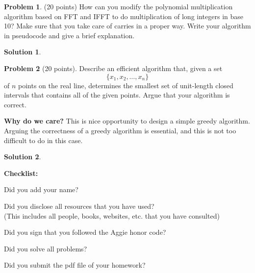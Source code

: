 \documentclass{article}
\theoremstyle{definition}
\newtheorem{problem}{Problem}
\newtheorem*{solution}{Solution}
\newcommand{\checklist}{\noindent\textbf{Checklist:}
\begin{compactitem}[$\Box$] 
\item Did you add your name? 
\item Did you disclose all resources that you have used? \\
(This includes all people, books, websites, etc. that you have consulted)
\item Did you sign that you followed the Aggie honor code? 
\item Did you solve all problems? 
\item Did you submit the pdf file of your homework?
\end{compactitem}
}
\begin{document}
\begin{problem} (20 points) 
How can you modify the polynomial multiplication algorithm based
  on FFT and IFFT to do multiplication of long integers in base 10?
  Make sure that you take care of carries in a proper way. Write your
  algorithm in pseudocode and give a brief explanation. 
\end{problem}
\begin{solution}
\end{solution}




\begin{problem}[20 points]
  Describe an efficient algorithm that, given a set
  $$\{ x_1, x_2, \ldots, x_n\}$$ of $n$ points on the real line,
  determines the smallest set of unit-length closed intervals that
  contains all of the given points. Argue that your algorithm is
  correct.

  {\small \textbf{Why do we care?} This is nice opportunity to design
    a simple greedy
    algorithm. Arguing the correctness of a greedy algorithm is
    essential, and this is not too difficult to do in this case.} 
  
\end{problem}
\begin{solution}
\end{solution}





\goodbreak
\checklist
\end{document}
